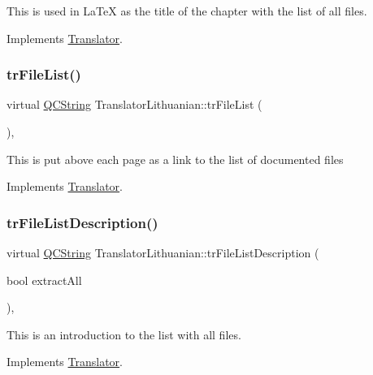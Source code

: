 This is used in La\+TeX as the title of the chapter with the list of all files. 

Implements \mbox{\hyperlink{class_translator}{Translator}}.

\mbox{\label{class_translator_lithuanian_a3686704e038372f8700dd0ce97887626}} 
\subsubsection{\texorpdfstring{trFileList()}{trFileList()}}
{\footnotesize\ttfamily virtual \mbox{\hyperlink{class_q_c_string}{Q\+C\+String}} Translator\+Lithuanian\+::tr\+File\+List (\begin{DoxyParamCaption}{ }\end{DoxyParamCaption})\hspace{0.3cm}{\ttfamily [inline]}, {\ttfamily [virtual]}}

This is put above each page as a link to the list of documented files 

Implements \mbox{\hyperlink{class_translator}{Translator}}.

\mbox{\label{class_translator_lithuanian_af86a33c8a97714d90eb27e4db8999a0d}} 
\subsubsection{\texorpdfstring{trFileListDescription()}{trFileListDescription()}}
{\footnotesize\ttfamily virtual \mbox{\hyperlink{class_q_c_string}{Q\+C\+String}} Translator\+Lithuanian\+::tr\+File\+List\+Description (\begin{DoxyParamCaption}\item[{bool}]{extract\+All }\end{DoxyParamCaption})\hspace{0.3cm}{\ttfamily [inline]}, {\ttfamily [virtual]}}

This is an introduction to the list with all files. 

Implements \mbox{\hyperlink{class_translator}{Translator}}.

